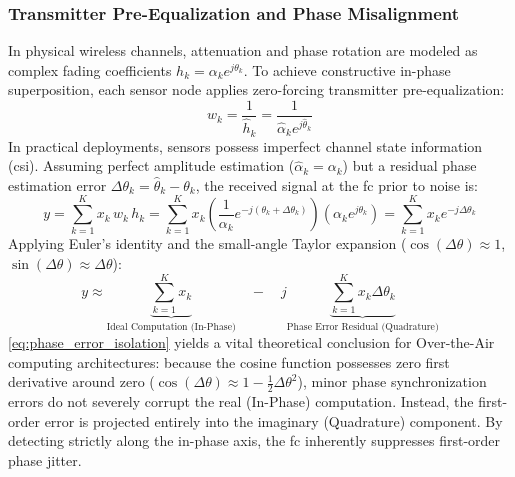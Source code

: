 \documentclass[Markos_Delaportas_1316.tex]{subfiles}
\begin{document}
\subsubsection{Transmitter Pre-Equalization and Phase Misalignment}
\label{subsubsec:preequalization_phase_error}
In physical wireless channels, attenuation and phase rotation are
modeled as complex fading coefficients $h_k = \alpha_k e^{j\theta_k}$.
To achieve constructive in-phase superposition, each sensor node
applies zero-forcing transmitter pre-equalization:
\begin{equation}
    w_k = \frac{1}{\hat{h}_k} = \frac{1}{\hat{\alpha}_k e^{j\hat{\theta}_k}}
    \label{eq:preequalization_weight}
\end{equation}
In practical deployments, sensors possess imperfect channel state
information (\gls{csi}). Assuming perfect amplitude estimation
($\hat{\alpha}_k = \alpha_k$) but a residual phase estimation error
$\Delta\theta_k = \hat{\theta}_k - \theta_k$, the received
signal at the \gls{fc} prior to noise is:
\begin{equation}
    y = \sum_{k=1}^K x_k \, w_k \, h_k = \sum_{k=1}^K x_k \left(
    \frac{1}{\alpha_k} e^{-j(\theta_k + \Delta\theta_k)} \right)
    \left( \alpha_k e^{j\theta_k} \right) = \sum_{k=1}^K x_k
    e^{-j\Delta\theta_k}
    \label{eq:phase_misalignment_superposition}
\end{equation}
Applying Euler's identity and the small-angle Taylor expansion
($\cos(\Delta\theta) \approx 1$, $\sin(\Delta\theta) \approx \Delta\theta$):
\begin{equation}
    y \approx \underbrace{\sum_{k=1}^K x_k}_{\text{Ideal Computation
    (In-Phase)}} \quad - \quad j \underbrace{\sum_{k=1}^K x_k
    \Delta\theta_k}_{\text{Phase Error Residual (Quadrature)}}
    \label{eq:phase_error_isolation}
\end{equation}
\cref{eq:phase_error_isolation} yields a vital theoretical conclusion
for Over-the-Air computing architectures: because the
cosine function possesses zero first derivative around zero
($\cos(\Delta\theta) \approx 1 - \frac{1}{2}\Delta\theta^2$), minor
phase synchronization errors do not severely corrupt the real
(In-Phase) computation. Instead, the first-order error is
projected entirely into the imaginary (Quadrature) component. By
detecting strictly along the in-phase axis, the \gls{fc}
inherently suppresses first-order phase jitter.
\end{document}
